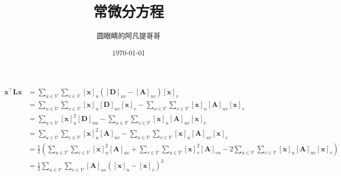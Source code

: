 \documentclass[openany]{ctexart}
\theoremstyle{definition}
\def \xv {\bm{x}}
\def \Av {\mathbf{A}}
\def \Dv {\mathbf{D}}
\def \Lv {\mathbf{L}}
\def \Vcal {\mathcal{V}}
\begin{document}
\title{常微分方程}
\author{圆眼睛的阿凡提哥哥}
\date{\today}
\maketitle

\begin{align*}
    \xv^\top \Lv \xv & = \sum_{u \in \Vcal} \sum_{v \in \Vcal} [\xv]_u ([\Dv]_{uv} - [\Av]_{uv}) [\xv]_v                                                     \\
                     & = \sum_{u \in \Vcal} \sum_{v \in \Vcal} [\xv]_u [\Dv]_{uv} [\xv]_v - \sum_{u \in \Vcal} \sum_{v \in \Vcal} [\xv]_u [\Av]_{uv} [\xv]_v \\
                     & = \sum_{u \in \Vcal} [\xv]_u^2 [\Dv]_{uu} - \sum_{u \in \Vcal} \sum_{v \in \Vcal} [\xv]_u [\Av]_{uv} [\xv]_v                          \\
                     & = \sum_{u \in \Vcal} \sum_{v \in \Vcal} [\xv]_u^2 [\Av]_{uv} - \sum_{u \in \Vcal} \sum_{v \in \Vcal} [\xv]_u [\Av]_{uv} [\xv]_v \\
                     & = \frac{1}{2} \left( \sum_{u \in \Vcal} \sum_{v \in \Vcal} [\xv]_u^2 [\Av]_{uv} + \sum_{v \in \Vcal} \sum_{u \in \Vcal} [\xv]_v^2 [\Av]_{vu} - 2 \sum_{u \in \Vcal} \sum_{v \in \Vcal} [\xv]_u [\Av]_{uv} [\xv]_v \right) \\
                     & = \frac{1}{2} \sum_{u \in \Vcal} \sum_{v \in \Vcal} [\Av]_{uv} ([\xv]_u - [\xv]_v)^2
\end{align*}
\end{document}
